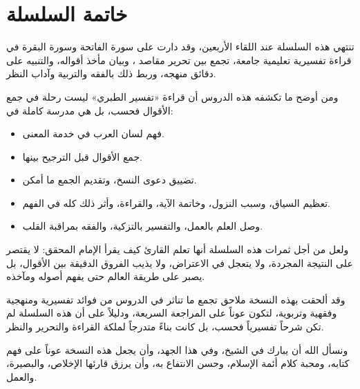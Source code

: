 \chapter*{خاتمة السلسلة}

تنتهي هذه السلسلة عند اللقاء الأربعين، وقد دارت على سورة الفاتحة وسورة البقرة في قراءة تفسيرية تعليمية جامعة، تجمع بين تحرير مقاصد ، وبيان مأخذ أقواله، والتنبيه على دقائق منهجه، وربط ذلك بالفقه والتربية وآداب النظر.

ومن أوضح ما تكشفه هذه الدروس أن قراءة «تفسير الطبري» ليست رحلة في جمع الأقوال فحسب، بل هي مدرسة كاملة في:
\begin{itemize}
    \item فهم لسان العرب في خدمة المعنى.
    \item جمع الأقوال قبل الترجيح بينها.
    \item تضييق دعوى النسخ، وتقديم الجمع ما أمكن.
    \item تعظيم السياق، وسبب النزول، وخاتمة الآية، والقراءة، وأثر ذلك كله في الفهم.
    \item وصل العلم بالعمل، والتفسير بالتزكية، والفقه بمراقبة القلب.
\end{itemize}

ولعل من أجل ثمرات هذه السلسلة أنها تعلم القارئ كيف يقرأ الإمام المحقق: لا يقتصر على النتيجة المجردة، ولا يتعجل في الاعتراض، ولا يذيب الفروق الدقيقة بين الأقوال، بل يصبر على طريقة العالم حتى يفهم أصوله ومآخذه.

وقد ألحقت بهذه النسخة ملاحق تجمع ما تناثر في الدروس من فوائد تفسيرية ومنهجية وفقهية وتربوية، لتكون عوناً على المراجعة السريعة، ودليلاً على أن هذه السلسلة لم تكن شرحاً تفسيرياً فحسب، بل كانت بناءً متدرجاً لملكة القراءة والتحرير والنظر.

ونسأل الله أن يبارك في الشيخ، وفي هذا الجهد، وأن يجعل هذه النسخة عوناً على فهم كتابه، ومحبة كلام أئمة الإسلام، وحسن الانتفاع به، وأن يرزق قارئها الإخلاص، والبصيرة، والعمل.
